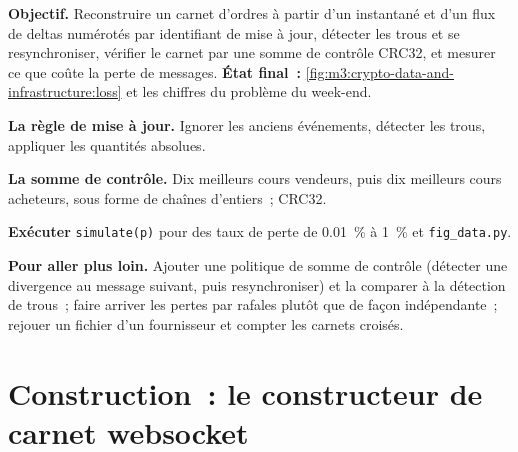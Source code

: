 \begin{tutorial}
\textbf{Objectif.} Reconstruire un carnet d'ordres à partir d'un instantané et d'un flux de deltas numérotés par identifiant de mise à jour, détecter les trous et se resynchroniser, vérifier le carnet par une
somme de contrôle CRC32, et mesurer ce que coûte la perte de messages. \textbf{État final~:} \cref{fig:m3:crypto-data-and-infrastructure:loss} et les chiffres du problème du week-end.
\begin{tutsteps}
\item \textbf{La règle de mise à jour.} Ignorer les anciens événements, détecter les trous, appliquer les quantités absolues.
\label{lst:m3:crypto-data-and-infrastructure:apply}
\item \textbf{La somme de contrôle.} Dix meilleurs cours vendeurs, puis dix meilleurs cours acheteurs, sous forme de chaînes d'entiers~; CRC32.
\label{lst:m3:crypto-data-and-infrastructure:checksum}
\item \textbf{Exécuter} \texttt{simulate(p)} pour des taux de perte de 0.01~\% à 1~\% et \texttt{fig\_data.py}.
\end{tutsteps}
\textbf{Pour aller plus loin.} Ajouter une politique de somme de contrôle (détecter une divergence au message suivant, puis resynchroniser) et la comparer à la détection de trous~; faire arriver les pertes
par rafales plutôt que de façon indépendante~; rejouer un fichier d'un fournisseur et compter les carnets croisés.
\end{tutorial}

\section{Construction~: le constructeur de carnet websocket}\label{bld:m3:crypto-data-and-infrastructure:wsbook}

